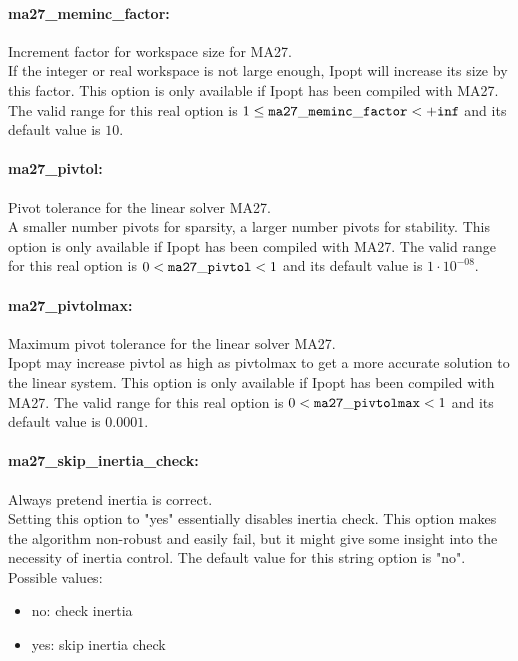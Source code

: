\paragraph{ma27\_meminc\_factor:}\label{sec:ma27_meminc_factor} Increment factor for workspace size for MA27. $\;$ \\
 If the integer or real workspace is not large
enough, Ipopt will increase its size by this
factor.  This option is only available if Ipopt
has been compiled with MA27. The valid range for this real option is 
$1 \le {\tt ma27\_meminc\_factor } <  {\tt +inf}$
and its default value is $10$.


\paragraph{ma27\_pivtol:}\label{sec:ma27_pivtol} Pivot tolerance for the linear solver MA27. $\;$ \\
 A smaller number pivots for sparsity, a larger
number pivots for stability.  This option is only
available if Ipopt has been compiled with MA27. The valid range for this real option is 
$0 <  {\tt ma27\_pivtol } <  1$
and its default value is $1 \cdot 10^{-08}$.


\paragraph{ma27\_pivtolmax:}\label{sec:ma27_pivtolmax} Maximum pivot tolerance for the linear solver MA27. $\;$ \\
 Ipopt may increase pivtol as high as pivtolmax to
get a more accurate solution to the linear
system.  This option is only available if Ipopt
has been compiled with MA27. The valid range for this real option is 
$0 <  {\tt ma27\_pivtolmax } <  1$
and its default value is $0.0001$.


\paragraph{ma27\_skip\_inertia\_check:}\label{sec:ma27_skip_inertia_check} Always pretend inertia is correct. $\;$ \\
 Setting this option to "yes" essentially disables
inertia check. This option makes the algorithm
non-robust and easily fail, but it might give
some insight into the necessity of inertia
control.
The default value for this string option is "no".
\\ 
Possible values:
\begin{itemize}
   \item no: check inertia
   \item yes: skip inertia check
\end{itemize}


